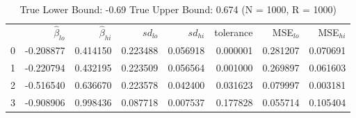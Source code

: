\begin{table}
\caption{True Lower Bound: -0.69 True Upper Bound: 0.674 (N = 1000, R = 1000)}
\begin{tabular}{lrrrrrrr}
 & $\hat{\beta}_{lo}$ & $\hat{\beta}_{hi}$ & $sd_{lo}$ & $sd_{hi}$ & tolerance & MSE$_{lo}$ & MSE$_{hi}$ \\
0 & -0.208877 & 0.414150 & 0.223488 & 0.056918 & 0.000001 & 0.281207 & 0.070691 \\
1 & -0.220794 & 0.432195 & 0.223509 & 0.056564 & 0.001000 & 0.269897 & 0.061603 \\
2 & -0.516540 & 0.636670 & 0.223578 & 0.042400 & 0.031623 & 0.079997 & 0.003181 \\
3 & -0.908906 & 0.998436 & 0.087718 & 0.007537 & 0.177828 & 0.055714 & 0.105404 \\
\end{tabular}
\end{table}
